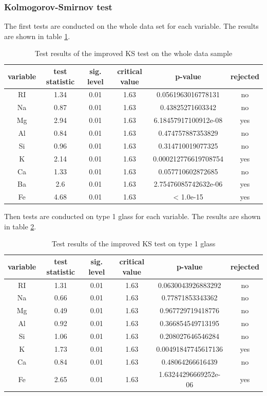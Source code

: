\documentclass[a4paper, 12pt, titlepage, headsepline, listof = totoc, bibliography = totoc, numbers = noenddot]{scrartcl}
\begin{document}
\subsubsection{Kolmogorov-Smirnov test}

The first tests are conducted on the whole data set for each variable. 
The results are shown in table \ref{tab:KS-full}.

\begin{table}[h!]
\centering
\begin{tabular}{|cccccc|} \hline variable & test statistic & sig. level & critical value & p-value & rejected\\ \hline RI & 1.34 & 0.01 & 1.63 & 0.0561963016778131 & no\\ 
Na & 0.87 & 0.01 & 1.63 & 0.43825271603342 & no\\ 
Mg & 2.94 & 0.01 & 1.63 & 6.18457917100912e-08 & yes\\ 
Al & 0.84 & 0.01 & 1.63 & 0.474757887353829 & no\\ 
Si & 0.96 & 0.01 & 1.63 & 0.314710019077325 & no\\ 
K & 2.14 & 0.01 & 1.63 & 0.000212776619708754 & yes\\ 
Ca & 1.33 & 0.01 & 1.63 & 0.057710602872685 & no\\ 
Ba & 2.6 & 0.01 & 1.63 & 2.75476085742632e-06 & yes\\ 
Fe & 4.68 & 0.01 & 1.63 & < 1.0e-15 & yes\\ \hline \end{tabular}\caption{Test results of the improved KS test on the whole data sample}
\label{tab:KS-full}
\end{table}

Then tests are conducted on type 1 glass for each variable.
The results are shown in table \ref{tab:KS-type1}.

\begin{table}[h!]
\centering
\begin{tabular}{|cccccc|} \hline variable & test statistic & sig. level & critical value & p-value & rejected\\ \hline RI & 1.31 & 0.01 & 1.63 & 0.0630043926883292 & no\\ 
Na & 0.66 & 0.01 & 1.63 & 0.77871853343362 & no\\ 
Mg & 0.49 & 0.01 & 1.63 & 0.967729719418776 & no\\ 
Al & 0.92 & 0.01 & 1.63 & 0.366854549713195 & no\\ 
Si & 1.06 & 0.01 & 1.63 & 0.208027646546284 & no\\ 
K & 1.73 & 0.01 & 1.63 & 0.00491847745617136 & yes\\ 
Ca & 0.84 & 0.01 & 1.63 & 0.48064266616439 & no\\ 
Fe & 2.65 & 0.01 & 1.63 & 1.63244296669252e-06 & yes\\ \hline \end{tabular}\caption{Test results of the improved KS test on type 1 glass}
\label{tab:KS-type1}
\end{table}
\end{document}
